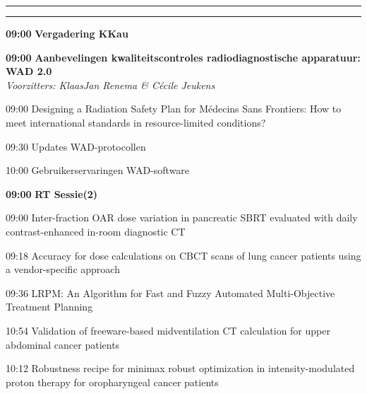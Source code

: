 \documentclass[a4paper,10pt]{report}
\begin{document}
\begin{multicols*}{3}
\vfill

\hrule\vspace{2mm}
\vspace{2mm}\hrule\strut


\begin{packed_enum}
\item[\textbf{09:00}] \textbf{Vergadering KKau}
\end{packed_enum} %

\vfill

\begin{packed_enum}
\item[\textbf{09:00}] \textbf{Aanbevelingen kwaliteitscontroles radiodiagnostische apparatuur: WAD 2.0}\\\textit{Voorzitters: KlaasJan Renema \& Cécile Jeukens}
\item[09:00] Designing a Radiation Safety Plan for Médecins Sans Fron\-tiers: How to meet international standards in resource-limited conditions?
\item[09:30] Updates WAD-protocollen
\item[10:00] Gebruikerservaringen WAD-software
\end{packed_enum} %

\vfill

\begin{packed_enum}
\item[\textbf{09:00}]{\textbf{RT Sessie(2)}}
\item[09:00] Inter-fraction OAR dose variation in pancreatic SBRT eval\-uated with daily contrast-enhanced in-room diagnostic CT
\item[09:18] Accuracy for dose calculations on CBCT scans of lung cancer patients using a vendor-specific approach
\item[09:36] LRPM: An Algorithm for Fast and Fuzzy Automated Multi-Objective Treatment Planning
\item[10:54] Validation of freeware-based midventilation CT calculation for upper abdominal cancer patients
\item[10:12] Robustness recipe for minimax robust optimization in in\-ten\-sity-modulated proton therapy for oropharyngeal can\-cer patients
\end{packed_enum} %


\end{multicols*}
\end{document}
